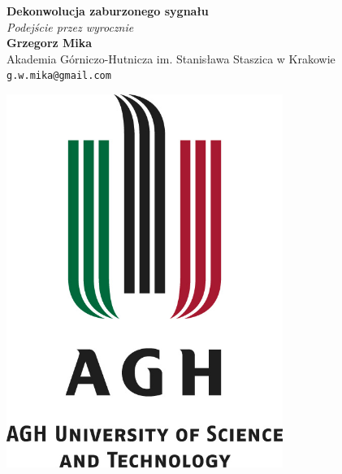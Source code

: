 \documentclass[a0,portrait]{a0poster}
\begin{document}


\begin{minipage}[b]{0.75\linewidth}
\veryHuge \color{NavyBlue} \textbf{Dekonwolucja zaburzonego sygnału} \color{Black}\\ %
\Huge\textit{Podejście przez wyrocznie}\\[2cm] %
\huge \textbf{Grzegorz Mika}\\[0.5cm] %
\huge Akademia Górniczo-Hutnicza im. Stanisława Staszica w Krakowie\\[0.4cm] %
\Large \texttt{g.w.mika@gmail.com}\\
\end{minipage}
%
\begin{minipage}[b]{0.25\linewidth}
\includegraphics[width=9cm]{agh}\\
\end{minipage}
\end{document}
